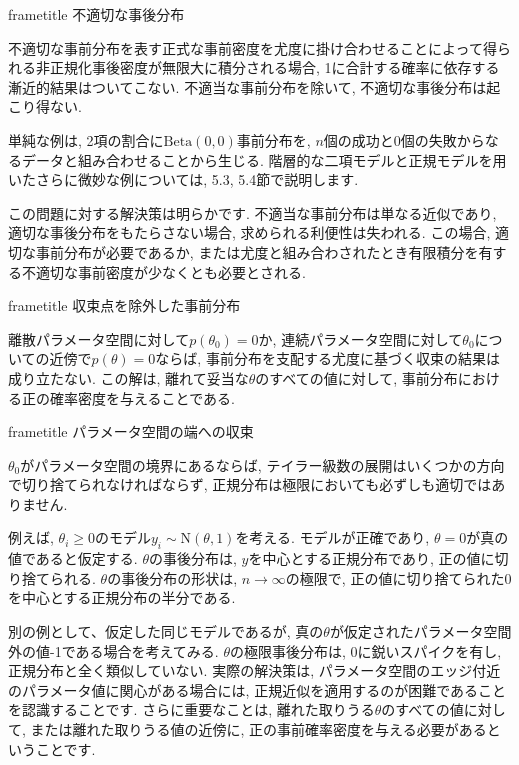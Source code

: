 \documentclass[10pt,dvipdfmx,a4]{beamer}
\newcommand{\dbox}[1]{\begin{beamercolorbox}[wd=122mm, sep=0pt, shadow=false, rounded=false]{frametitle} { #1}\end{beamercolorbox}}
\begin{document}

\begin{frame}
\dbox{不適切な事後分布}
不適切な事前分布を表す正式な事前密度を尤度に掛け合わせることによって得られる非正規化事後密度が無限大に積分される場合, 1に合計する確率に依存する漸近的結果はついてこない.
不適当な事前分布を除いて, 不適切な事後分布は起こり得ない.

単純な例は, 2項の割合に$\text{Beta}(0, 0)$事前分布を, $n$個の成功と0個の失敗からなるデータと組み合わせることから生じる.
階層的な二項モデルと正規モデルを用いたさらに微妙な例については, 5.3, 5.4節で説明します.

この問題に対する解決策は明らかです.
不適当な事前分布は単なる近似であり, 適切な事後分布をもたらさない場合, 求められる利便性は失われる.
この場合, 適切な事前分布が必要であるか, または尤度と組み合わされたとき有限積分を有する不適切な事前密度が少なくとも必要とされる.

\dbox{収束点を除外した事前分布}
離散パラメータ空間に対して$p(\theta_0)=0$か, 連続パラメータ空間に対して$\theta_0$についての近傍で$p(\theta)=0$ならば, 事前分布を支配する尤度に基づく収束の結果は成り立たない.
この解は, 離れて妥当な$\theta$のすべての値に対して, 事前分布における正の確率密度を与えることである.
\end{frame}


\begin{frame}
\dbox{パラメータ空間の端への収束}
$\theta_0$がパラメータ空間の境界にあるならば, テイラー級数の展開はいくつかの方向で切り捨てられなければならず, 正規分布は極限においても必ずしも適切ではありません.

例えば, $\theta_i\geq 0$のモデル$y_i\sim \text{N}(\theta,1)$を考える.
モデルが正確であり, $\theta=0$が真の値であると仮定する.
$\theta$の事後分布は, $y$を中心とする正規分布であり, 正の値に切り捨てられる.
$\theta$の事後分布の形状は, $n\rightarrow \infty$の極限で, 正の値に切り捨てられた0を中心とする正規分布の半分である.

別の例として、仮定した同じモデルであるが, 真の$\theta$が仮定されたパラメータ空間外の値-1である場合を考えてみる.
$\theta$の極限事後分布は, 0に鋭いスパイクを有し, 正規分布と全く類似していない.
実際の解決策は, パラメータ空間のエッジ付近のパラメータ値に関心がある場合には, 正規近似を適用するのが困難であることを認識することです.
さらに重要なことは, 離れた取りうる$\theta$のすべての値に対して, または離れた取りうる値の近傍に, 正の事前確率密度を与える必要があるということです.
\end{frame}
\end{document}
